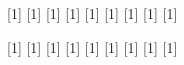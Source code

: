 [1]{} %
[1]{} %
[1]{} %
[1]{} %
[1]{} %
[1]{} %
[1]{} %
[1]{} %
[1]{} %

[1]{} %
[1]{} %
[1]{} %
[1]{} %
[1]{} %
[1]{} %
[1]{} %
[1]{} %
[1]{} %


%
%






%
%
\newcommand{\mean}{\bar}
\newcommand{\widemean}{\overline}
\newcommand{\median}{\tilde}
\newcommand{\widemedian}{\widetilde}
\newcommand{\sample}[1]{\hat{#1}}
\newcommand{\population}[1]{#1^{\ast}}
\newcommand{\param}[1]{\mathord{\mathsmaller{\mathrm{#1}}}}
\newcommand{\randvar}[1]{\mathord{\mathlarger{\mathsf{#1}}}}
\newcommand{\mle}{\mathrm{MLE}}
\newcommand{\map}{\mathrm{MAP}}


%
%
\DeclareMathOperator*{\maximize}{\mathrm{maximize}}
\DeclareMathOperator*{\minimize}{\mathrm{minimize}}
\DeclareMathOperator*{\subjectto}{\mathrm{subject}\ \mathrm{to}}
\DeclareMathOperator*{\argmax}{\arg\max}
\DeclareMathOperator*{\argmin}{\arg\min}


%
%
\DeclareMathOperator*{\convex}{\mathrm{convex}}
\DeclareMathOperator*{\concave}{\mathrm{concave}}


